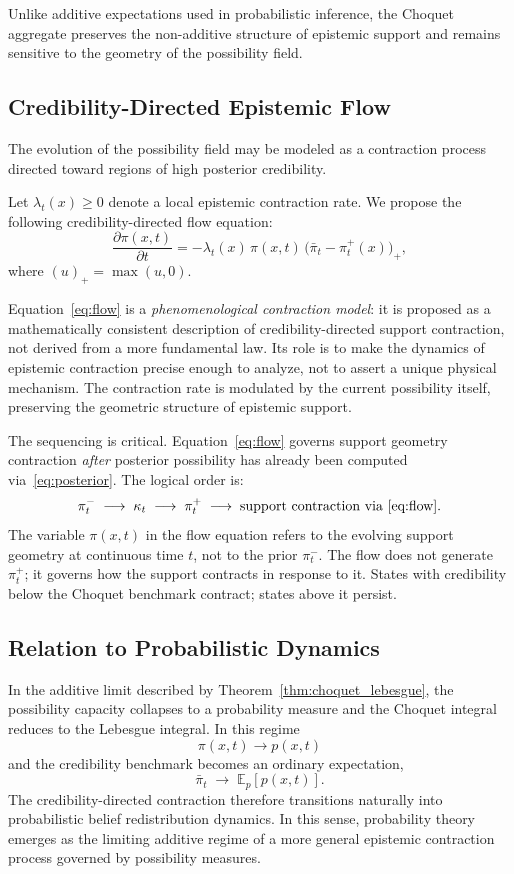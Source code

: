 \documentclass[12pt]{article}
\begin{document}
Unlike additive expectations used in probabilistic inference, the Choquet
aggregate preserves the non-additive structure of epistemic support and remains
sensitive to the geometry of the possibility field.

\subsection{Credibility-Directed Epistemic Flow}

The evolution of the possibility field may be modeled as a contraction process
directed toward regions of high posterior credibility.

Let $\lambda_t(x) \ge 0$ denote a local epistemic contraction rate. We propose
the following credibility-directed flow equation:
\begin{equation}
\frac{\partial\pi(x,t)}{\partial t}
= -\lambda_t(x)\,\pi(x,t)\,\bigl(\bar{\pi}_t - \pi^+_t(x)\bigr)_+,
\label{eq:flow}
\end{equation}
where $(u)_+ = \max(u,0)$.

Equation~\eqref{eq:flow} is a \emph{phenomenological contraction model}: it is
proposed as a mathematically consistent description of credibility-directed support
contraction, not derived from a more fundamental law. Its role is to make the
dynamics of epistemic contraction precise enough to analyze, not to assert a
unique physical mechanism. The contraction rate is modulated by the current
possibility itself, preserving the geometric structure of epistemic support.

The sequencing is critical. Equation~\eqref{eq:flow} governs support geometry
contraction \emph{after} posterior possibility has already been computed
via~\eqref{eq:posterior}. The logical order is:
\[
\pi^-_t \;\longrightarrow\; \kappa_t \;\longrightarrow\; \pi^+_t
\;\longrightarrow\; \text{support contraction via~\eqref{eq:flow}}.
\]
The variable $\pi(x,t)$ in the flow equation refers to the evolving support
geometry at continuous time $t$, not to the prior $\pi^-_t$. The flow does not
generate $\pi^+_t$; it governs how the support contracts in response to it.
States with credibility below the Choquet benchmark contract; states above it
persist.

\subsection{Relation to Probabilistic Dynamics}

In the additive limit described by Theorem~\ref{thm:choquet_lebesgue}, the
possibility capacity collapses to a probability measure and the Choquet integral
reduces to the Lebesgue integral. In this regime
\[
\pi(x,t) \to p(x,t)
\]
and the credibility benchmark becomes an ordinary expectation,
\[
\bar{\pi}_t \;\longrightarrow\; \mathbb{E}_p[p(x,t)].
\]
The credibility-directed contraction therefore transitions naturally into
probabilistic belief redistribution dynamics. In this sense, probability theory
emerges as the limiting additive regime of a more general epistemic contraction
process governed by possibility measures.
\end{document}
